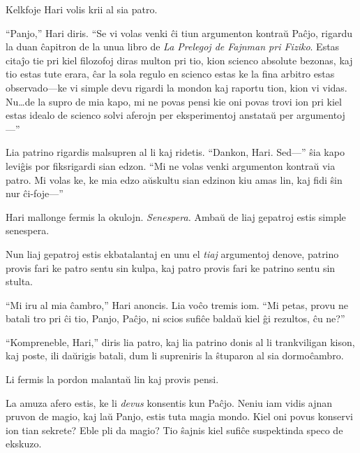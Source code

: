Kelkfoje Hari volis krii al sia patro.

“Panjo,” Hari diris.
“Se vi volas venki ĉi tiun argumenton kontraŭ Paĉjo, rigardu la duan ĉapitron de la unua libro de \emph{La Prelegoj de Fajnman pri Fiziko}.
Estas citaĵo tie pri kiel filozofoj diras multon pri tio, kion scienco absolute bezonas, kaj tio estas tute erara, ĉar la sola regulo en scienco estas ke la fina arbitro estas observado—ke vi simple devu rigardi la mondon kaj raportu tion, kion vi vidas.
Nu…de la supro de mia kapo, mi ne povas pensi kie oni povas trovi ion pri kiel estas idealo de scienco solvi aferojn per eksperimentoj anstataŭ per argumentoj—”

Lia patrino rigardis malsupren al li kaj ridetis.
“Dankon, Hari.
Sed—” ŝia kapo leviĝis por fiksrigardi sian edzon.
“Mi ne volas venki argumenton kontraŭ via patro.
Mi volas ke, ke mia edzo aŭskultu sian edzinon kiu amas lin, kaj fidi ŝin nur ĉi-foje—”

Hari mallonge fermis la okulojn.
\emph{Senespera.}
Ambaŭ de liaj gepatroj estis simple senespera.

Nun liaj gepatroj estis ekbatalantaj en unu el \emph{tiaj} argumentoj denove, patrino provis fari ke patro sentu sin kulpa, kaj patro provis fari ke patrino sentu sin stulta.

“Mi iru al mia ĉambro,” Hari anoncis.
Lia voĉo tremis iom.
“Mi petas, provu ne batali tro pri ĉi tio, Panjo, Paĉjo, ni scios sufiĉe baldaŭ kiel ĝi rezultos, ĉu ne?”

“Kompreneble, Hari,” diris lia patro, kaj lia patrino donis al li trankviligan kison, kaj poste, ili daŭrigis batali, dum li supreniris la ŝtuparon al sia dormoĉambro.

Li fermis la pordon malantaŭ lin kaj provis pensi.

La amuza afero estis, ke li \emph{devus} konsentis kun Paĉjo.
Neniu iam vidis ajnan pruvon de magio, kaj laŭ Panjo, estis tuta magia mondo.
Kiel oni povus konservi ion tian sekrete?
Eble pli da magio?
Tio ŝajnis kiel sufiĉe suspektinda speco de ekskuzo.



